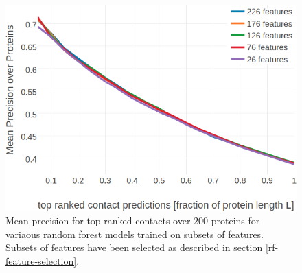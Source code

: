 \documentclass[11pt,a4paper,twoside]{book}
\theoremstyle{definition}
\theoremstyle{definition}
\theoremstyle{remark}
\begin{document}
\begin{figure}

{\centering \includegraphics[width=0.9\linewidth]{img/random_forest_contact_prior/additional_contat_score_features/precision_vs_rank_featureselection_random_forest_nestimators1000_maxfeatures03_maxdepth100_minsamplesleaf10_pLLfeature} 

}

\caption{Mean precision for top
ranked contacts over 200 proteins for variaous random forest models
trained on subsets of features. Subsets of features have been selected
as described in section \ref{rf-feature-selection}.}\label{fig:feature-selection-rf-with-pll-score}
\end{figure}
\end{document}
